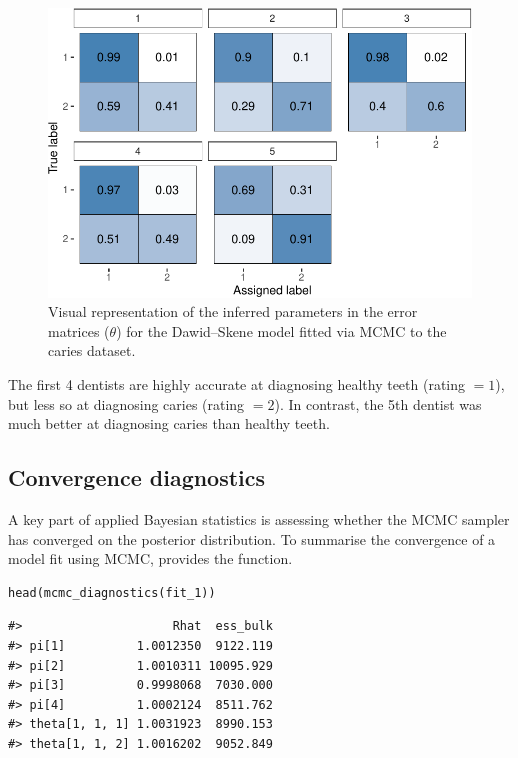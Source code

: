 \begin{figure}

{\centering \includegraphics{rater_files/figure-latex/plot-theta-caries-1} 

}

\caption{Visual representation of the inferred parameters in the error matrices ($\theta$) for the Dawid--Skene model fitted via MCMC to the caries dataset.}\label{fig:plot-theta-caries}
\end{figure}

The first 4 dentists are highly accurate at diagnosing healthy teeth (rating \(= 1\)), but less so at diagnosing caries (rating \(= 2\)). In contrast, the 5th
dentist was much better at diagnosing caries than healthy teeth.

\hypertarget{sec:convergence-diagnostics}{%
\subsection{Convergence diagnostics}\label{sec:convergence-diagnostics}}

A key part of applied Bayesian statistics is assessing whether the
MCMC sampler has converged on the posterior distribution. To summarise the
convergence of a model fit using MCMC,  provides the
 function.

\begin{verbatim}
head(mcmc_diagnostics(fit_1))
\end{verbatim}

\begin{verbatim}
#>                     Rhat  ess_bulk
#> pi[1]          1.0012350  9122.119
#> pi[2]          1.0010311 10095.929
#> pi[3]          0.9998068  7030.000
#> pi[4]          1.0002124  8511.762
#> theta[1, 1, 1] 1.0031923  8990.153
#> theta[1, 1, 2] 1.0016202  9052.849
\end{verbatim}

